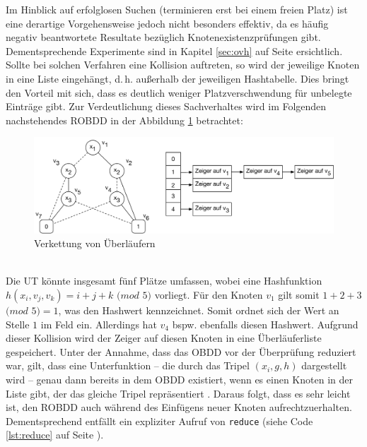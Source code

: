 Im Hinblick auf erfolglosen Suchen (terminieren erst bei einem freien Platz) ist eine derartige Vorgehensweise jedoch nicht besonders effektiv, da es häufig negativ beantwortete Resultate bezüglich Knotenexistenzprüfungen gibt. Dementsprechende Experimente sind in Kapitel \ref{sec:ovh} auf Seite \pageref{sec:ovh} ersichtlich.
\newpage
{}
\label{sec:verkettung}
Sollte bei solchen Verfahren eine Kollision auftreten, so wird der jeweilige Knoten in eine Liste eingehängt, d.\,h. außerhalb der jeweiligen Hashtabelle. Dies bringt den Vorteil mit sich, dass es deutlich weniger Platzverschwendung für unbelegte Einträge gibt. Zur Verdeutlichung dieses Sachverhaltes wird im Folgenden nachstehendes ROBDD in der Abbildung \ref{fig:verkettung} betrachtet:
\begin{figure}[bth]
	\centering
	\includegraphics[scale=0.5]{./img/utable2}
	\caption[Verkettung von Überläufern]{Verkettung von Überläufern}
	\label{fig:verkettung}
\end{figure}\\
Die UT könnte insgesamt fünf Plätze umfassen, wobei eine Hashfunktion $h(x_i, v_j, v_k) = i + j + k$ $(mod$ $5)$ vorliegt. Für den Knoten $v_1$ gilt somit $1 + 2 + 3$ $(mod$ $5) = 1$, was den Hashwert kennzeichnet. Somit ordnet sich der Wert an Stelle $1$ im Feld ein. Allerdings hat $v_4$ bspw. ebenfalls diesen Hashwert. Aufgrund dieser Kollision wird der Zeiger auf diesen Knoten in eine Überläuferliste gespeichert. Unter der Annahme, dass das OBDD vor der Überprüfung reduziert war, gilt, dass eine Unterfunktion -- die durch das Tripel $(x_i, g, h)$ dargestellt wird -- genau dann bereits in dem OBDD existiert, wenn es einen Knoten in der Liste gibt, der das gleiche Tripel repräsentiert \cite[S.112-114]{mt1998}. Daraus folgt, dass es sehr leicht ist, den ROBDD auch während des Einfügens neuer Knoten aufrechtzuerhalten. Dementsprechend entfällt ein expliziter Aufruf von \texttt{reduce} (siehe Code \ref{lst:reduce} auf Seite \pageref{lst:reduce}).\\

